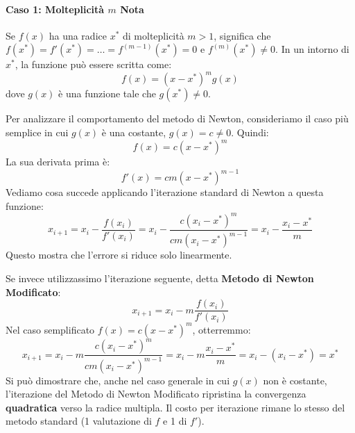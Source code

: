 \paragraph{Caso 1: Molteplicità $m$ Nota}
Se $f(x)$ ha una radice $x^*$ di molteplicità $m>1$, significa che $f(x^*) = f'(x^*) = \dots = f^{(m-1)}(x^*) = 0$ e $f^{(m)}(x^*) \neq 0$. In un intorno di $x^*$, la funzione può essere scritta come:
$$ f(x) = (x-x^*)^m g(x) $$
dove $g(x)$ è una funzione tale che $g(x^*) \neq 0$.

Per analizzare il comportamento del metodo di Newton, consideriamo il caso più semplice in cui $g(x)$ è una costante, $g(x) = c \neq 0$. Quindi:
$$ f(x) = c(x-x^*)^m $$
La sua derivata prima è:
$$ f'(x) = cm(x-x^*)^{m-1} $$
Vediamo cosa succede applicando l'iterazione standard di Newton a questa funzione:
$$ x_{i+1} = x_i - \frac{f(x_i)}{f'(x_i)} = x_i - \frac{c(x_i-x^*)^m}{cm(x_i-x^*)^{m-1}} = x_i - \frac{x_i - x^*}{m} $$
Questo mostra che l'errore si riduce solo linearmente.

Se invece utilizzassimo l'iterazione seguente, detta \textbf{Metodo di Newton Modificato}:
$$ x_{i+1} = x_i - m \frac{f(x_i)}{f'(x_i)} $$
Nel caso semplificato $f(x)=c(x-x^*)^m$, otterremmo:
$$ x_{i+1} = x_i - m \frac{c(x_i-x^*)^m}{cm(x_i-x^*)^{m-1}} = x_i - m \frac{x_i - x^*}{m} = x_i - (x_i - x^*) = x^* $$
Si può dimostrare che, anche nel caso generale in cui $g(x)$ non è costante, l'iterazione del Metodo di Newton Modificato ripristina la convergenza \textbf{quadratica} verso la radice multipla. Il costo per iterazione rimane lo stesso del metodo standard (1 valutazione di $f$ e 1 di $f'$).
